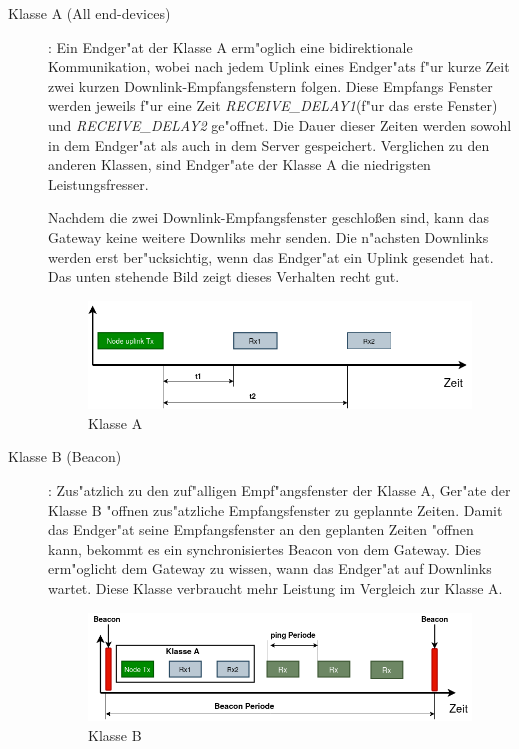 \begin{description}
	\item [Klasse A (All end-devices) \label{classA}]: Ein Endger"at 
	der Klasse A erm"oglich eine bidirektionale Kommunikation, wobei 
	nach jedem Uplink eines Endger"ats f"ur kurze Zeit zwei kurzen 
	Downlink-Empfangsfenstern folgen. Diese Empfangs Fenster werden 
	jeweils f"ur eine Zeit \textit{RECEIVE\_DELAY1}(f"ur das erste 
	Fenster) und \textit{RECEIVE\_DELAY2} ge"offnet. Die Dauer dieser 
	Zeiten werden sowohl in dem Endger"at als auch in dem Server 
	gespeichert. Verglichen zu den anderen Klassen, sind Endger"ate 
	der Klasse A die niedrigsten Leistungsfresser. 
	
	Nachdem die zwei Downlink-Empfangsfenster geschlo\ss{}en sind, kann 
	das Gateway keine weitere Downliks mehr senden. Die n"achsten 
	Downlinks werden erst ber"ucksichtig, wenn das Endger"at ein Uplink 
	gesendet hat.
	Das unten stehende Bild zeigt dieses Verhalten recht gut.
	
	 \begin{figure}[h]
	 	\centering
	 	\includegraphics[width=14cm]{source/images/ClassA}
	 	\caption{Klasse A \label{fig:classA}}
	 \end{figure}
	
	\item [Klasse B (Beacon)]: Zus"atzlich zu den zuf"alligen 
	Empf"angsfenster der Klasse A, Ger"ate der Klasse B "offnen 
	zus"atzliche Empfangsfenster zu geplannte Zeiten. Damit das 
	Endger"at seine Empfangsfenster an den geplanten Zeiten "offnen 
	kann, bekommt es  ein synchronisiertes Beacon von dem Gateway. Dies 
	erm"oglicht dem Gateway zu wissen, wann das Endger"at auf Downlinks wartet. Diese Klasse verbraucht mehr Leistung im  Vergleich zur Klasse A. 
	
	 \begin{figure}[h]
		\centering
		\includegraphics[width=12cm]{source/images/ClassB}
		\caption{Klasse B \label{fig:classB}}
	\end{figure}
	

\end{description}
